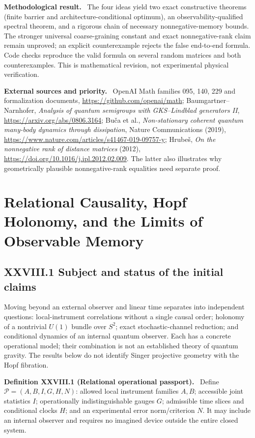 \documentclass[11pt,a4paper,oneside]{book}
\newcommand{\statement}[3]{\par\medskip\noindent\textbf{#1 #2 (#3).}\ }
\newcommand{\note}[1]{\par\medskip\noindent\textbf{#1}\ }
\begin{document}
\note{Methodological result.} The four ideas yield two exact constructive theorems (finite barrier and architecture-conditional optimum), an observability-qualified spectral theorem, and a rigorous chain of necessary nonnegative-memory bounds. The stronger universal coarse-graining constant and exact nonnegative-rank claim remain unproved; an explicit counterexample rejects the false end-to-end formula. Code checks reproduce the valid formula on several random matrices and both counterexamples. This is mathematical revision, not experimental physical verification.
\note{External sources and priority.} OpenAI Math families 095, 140, 229 and formalization documents, \url{https://github.com/openai/math}; Baumgartner--Narnhofer, \textit{Analysis of quantum semigroups with GKS--Lindblad generators II}, \url{https://arxiv.org/abs/0806.3164}; Bu\v ca et al., \textit{Non-stationary coherent quantum many-body dynamics through dissipation}, Nature Communications (2019), \url{https://www.nature.com/articles/s41467-019-09757-y}; Hrube\v s, \textit{On the nonnegative rank of distance matrices} (2012), \url{https://doi.org/10.1016/j.ipl.2012.02.009}. The latter also illustrates why geometrically plausible nonnegative-rank equalities need separate proof.
\chapter{Relational Causality, Hopf Holonomy, and the Limits of Observable Memory}
\section*{XXVIII.1 Subject and status of the initial claims}
Moving beyond an external observer and linear time separates into independent questions: local-instrument correlations without a single causal order; holonomy of a nontrivial $U(1)$ bundle over $S^2$; exact stochastic-channel reduction; and conditional dynamics of an internal quantum observer. Each has a concrete operational model; their combination is not an established theory of quantum gravity. The results below do not identify Singer projective geometry with the Hopf fibration.
\statement{Definition}{XXVIII.1}{Relational operational passport} Define $\mathcal P=(A,B,I,G,H,N)$: allowed local instrument families $A,B$; accessible joint statistics $I$; operationally indistinguishable gauges $G$; admissible time slices and conditional clocks $H$; and an experimental error norm/criterion $N$. It may include an internal observer and requires no imagined device outside the entire closed system.
\end{document}
